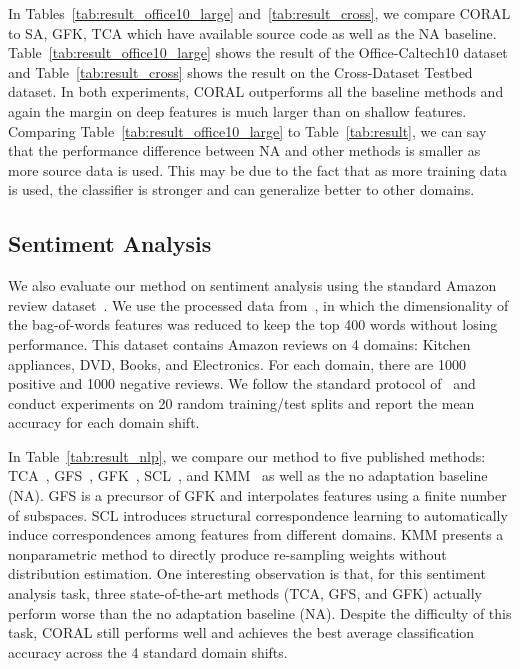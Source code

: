\documentclass[letterpaper]{article}
\begin{document}
In Tables~\ref{tab:result_office10_large} and~\ref{tab:result_cross}, we compare CORAL to SA, GFK, TCA which have available source code as well as the NA baseline. Table~\ref{tab:result_office10_large} shows the result of the Office-Caltech10 dataset and Table~\ref{tab:result_cross} shows the result on the Cross-Dataset Testbed dataset. In both experiments, CORAL outperforms all the baseline methods and again the margin on deep features is much larger than on shallow features. Comparing Table~\ref{tab:result_office10_large} to Table~\ref{tab:result}, we can say that the performance difference between NA and other methods is smaller as more source data is used. This may be due to the fact that as more training data is used, the classifier is stronger and can generalize better to other domains.

\subsection{Sentiment Analysis}
We also evaluate our method on sentiment analysis using the standard Amazon review dataset~\cite{Blitzer07Biographies,gong-icml13}. We use the processed data from~\cite{gong-icml13}, in which the dimensionality of the bag-of-words features was reduced to keep the top 400 words without losing performance. This dataset contains Amazon reviews on 4 domains: Kitchen appliances, DVD, Books, and Electronics. For each domain, there are 1000 positive and 1000 negative reviews. We follow the standard protocol of~\cite{gong-icml13} and conduct experiments on 20 random training/test splits and report the mean accuracy for each domain shift. 

In Table~\ref{tab:result_nlp}, we compare our method to five 
published methods: TCA~\cite{tca}, GFS~\cite{gopalan-iccv11}, GFK~\cite{gfk}, SCL~\cite{scl}, and KMM~\cite{huang_nips06} as well as the no adaptation baseline (NA). GFS is a precursor of GFK and interpolates features using a finite number of subspaces. SCL introduces structural correspondence learning to automatically induce correspondences among features from different domains. KMM presents a nonparametric method to directly produce re-sampling weights without distribution estimation. One interesting observation is that, for this sentiment analysis task, three state-of-the-art methods (TCA, GFS, and GFK) actually perform worse than the no adaptation baseline (NA). Despite the difficulty of this task, CORAL still performs well and achieves the best average classification accuracy across the 4 standard domain shifts.
\end{document}
